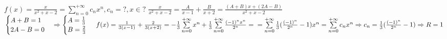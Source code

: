 \begin{Example}~\\
	$f(x) = \frac{x}{x^2+x-2} = \sum\limits_{n=0}^{+\infty}c_n x^n, c_n = ?, x \in ?$
	$\frac{x}{x^2+x-2} = \frac{A}{x - 1} + \frac{B}{x + 2} = \frac{(A+B)x + (2A-B)}{x^2+x-2}$\\
	$\begin{cases}
		A + B = 1\\
		2A - B = 0
	\end{cases} \Rightarrow
	\begin{cases}
		A = \frac{1}{3}\\
		B = \frac{2}{3}
	\end{cases} \: f(x) = \frac{1}{3(x-1)} + \frac{2}{3(x+2)} = -\frac{1}{3}\sum\limits_{n = 0}^{+\infty} x^n + \frac{1}{3}\sum\limits_{n = 0}^{+\infty}\frac{(-1)^n x^n}{2^n} =\\
	= \sum\limits_{n = 0}^{+\infty}\frac{1}{3}(\frac{(-1)^n}{2^n} - 1)x^n = \sum\limits_{n = 0}^{+\infty}c_n x^n \Rightarrow c_n = \frac{1}{3}(\frac{(-1)^n}{2^n} - 1) \Rightarrow R = 1$
\end{Example}
